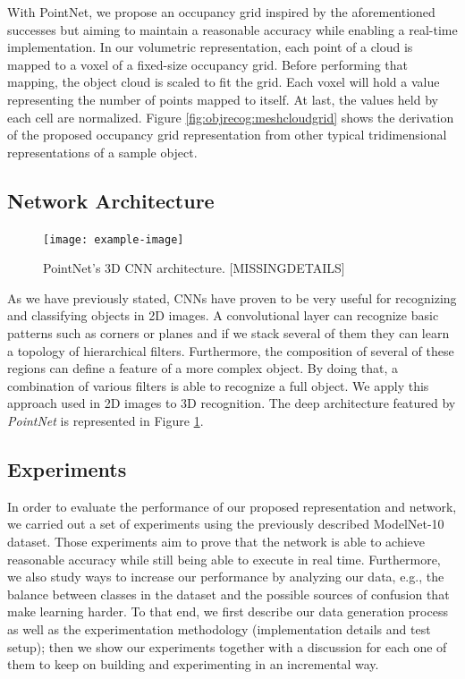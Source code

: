 With PointNet, we propose an occupancy grid inspired by the aforementioned successes but aiming to maintain a reasonable accuracy while enabling a real-time implementation. In our volumetric representation, each point of a cloud is mapped to a voxel of a fixed-size occupancy grid. Before performing that mapping, the object cloud is scaled to fit the grid. Each voxel will hold a value representing the number of points mapped to itself. At last, the values held by each cell are normalized. Figure \ref{fig:objrecog:meshcloudgrid} shows the derivation of the proposed occupancy grid representation from other typical tridimensional representations of a sample object.

\subsection{Network Architecture}
\label{cha:objrecog:sec:pointnet:subsec:network}

\begin{figure}[!b]
  \centering
  \texttt{[image: example-image]}
  \caption{PointNet's 3D \ac{CNN} architecture. [MISSINGDETAILS]}
  \label{fig:objrecog:pointnetarch}
\end{figure}

As we have previously stated, \acp{CNN} have proven to be very useful for recognizing and classifying objects in \ac{2D} images. A convolutional layer can recognize basic patterns such as corners or planes and if we stack several of them they can learn a topology of hierarchical filters. Furthermore, the composition of several of these regions can define a feature of a more complex object. By doing that, a combination of various filters is able to recognize a full object. We apply this approach used in \ac{2D} images to \ac{3D} recognition. The deep architecture featured by \emph{PointNet} is represented in Figure \ref{fig:objrecog:pointnetarch}.

\newpage

\subsection{Experiments}
\label{cha:objrecog:sec:pointnet:subsec:experiments}

In order to evaluate the performance of our proposed representation and network, we carried out a set of experiments using the previously described ModelNet-10 dataset. Those experiments aim to prove that the network is able to achieve reasonable accuracy while still being able to execute in real time. Furthermore, we also study ways to increase our performance by analyzing our data, e.g., the balance between classes in the dataset and the possible sources of confusion that make learning harder. To that end, we first describe our data generation process as well as the experimentation methodology (implementation details and test setup); then we show our experiments together with a discussion for each one of them to keep on building and experimenting in an incremental way.

